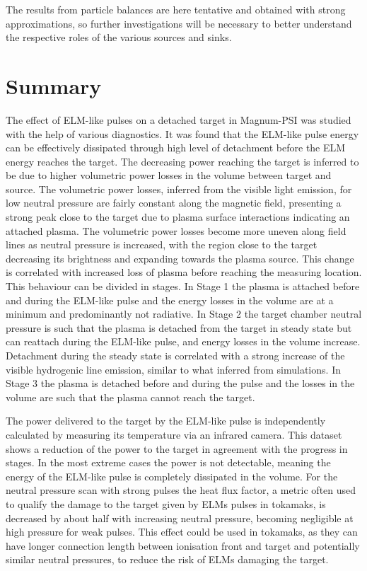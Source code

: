 The results from particle balances are here tentative and obtained with strong approximations, so further investigations will be necessary to better understand the respective roles of the various sources and sinks.


\section{Summary}\label{summary magnum-psi}

The effect of ELM-like pulses on a detached target in Magnum-PSI was studied with the help of various diagnostics. It was found that the ELM-like pulse energy can be effectively dissipated through high level of detachment before the ELM energy reaches the target. The decreasing power reaching the target is inferred to be due to higher volumetric power losses in the volume between target and source. The volumetric power losses, inferred from the visible light emission, for low neutral pressure are fairly constant along the magnetic field, presenting a strong peak close to the target due to plasma surface interactions indicating an attached plasma. The volumetric power losses become more uneven along field lines as neutral pressure is increased, with the region close to the target decreasing its brightness and expanding towards the plasma source. This change is correlated with increased loss of plasma before reaching the measuring location. This behaviour can be divided in stages. In Stage 1 the plasma is attached before and during the ELM-like pulse and the energy losses in the volume are at a minimum and predominantly not radiative. In Stage 2 the target chamber neutral pressure is such that the plasma is detached from the target in steady state but can reattach during the ELM-like pulse, and energy losses in the volume increase. Detachment during the steady state is correlated with a strong increase of the visible hydrogenic line emission, similar to what inferred from simulations.\cite{Zhou2022} In Stage 3 the plasma is detached before and during the pulse and the losses in the volume are such that the plasma cannot reach the target.

The power delivered to the target by the ELM-like pulse is independently calculated by measuring its temperature via an infrared camera. This dataset shows a reduction of the power to the target in agreement with the progress in stages. In the most extreme cases the power is not detectable, meaning the energy of the ELM-like pulse is completely dissipated in the volume. For the neutral pressure scan with strong pulses the heat flux factor, a metric often used to qualify the damage to the target given by ELMs pulses in tokamaks, is decreased by about half with increasing neutral pressure, becoming negligible at high pressure for weak pulses. This effect could be used in tokamaks, as they can have longer connection length between ionisation front and target and potentially similar neutral pressures, to reduce the risk of ELMs damaging the target.

